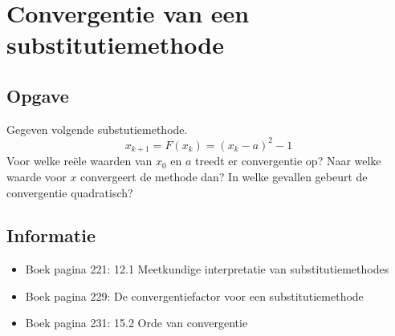 \documentclass[examenvragen.tex]{subfiles}
\begin{document}
\section{Convergentie van een substitutiemethode}

\subsection{Opgave}
Gegeven volgende substutiemethode.
\[
x_{k+1} = F(x_{k}) = (x_{k}-a)^2-1
\]
Voor welke re\"ele waarden van $x_0$ en $a$ treedt er convergentie op? Naar welke waarde voor $x$ convergeert de methode dan?
In welke gevallen gebeurt de convergentie quadratisch?

\subsection{Informatie}
\begin{itemize}
\item Boek pagina 221: 12.1 Meetkundige interpretatie van substitutiemethodes
\item Boek pagina 229: De convergentiefactor voor een substitutiemethode
\item Boek pagina 231: 15.2 Orde van convergentie
\end{itemize}
\end{document}
